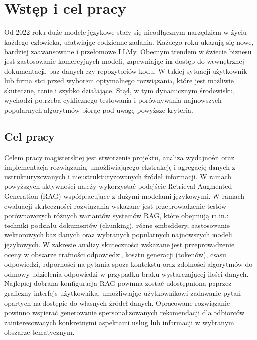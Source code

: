 \cleardoublepage

\chapter{Wstęp i cel pracy}
Od 2022 roku duże modele językowe stały się nieodłącznym narzędziem w życiu każdego człowieka, ułatwiając codzienne zadania. Każdego roku ukazują się nowe, bardziej zaawansowane i przełomowe LLMy. Obecnym trendem w świecie biznesu jest zastosowanie komercyjnych modeli, zapewniając im dostęp do wewnętrznej dokumentacji, baz danych czy repozytoriów kodu. W takiej sytuacji użytkownik lub firma stoi przed wyborem optymalnego rozwiązania, które jest możliwie skuteczne, tanie i szybko działające. Stąd, w tym dynamicznym środowisku, wychodzi potrzeba cyklicznego testowania i porównywania najnowszych popularnych algorytmów biorąc pod uwagę powyższe kryteria.


    \section{Cel pracy}
    Celem pracy magisterskiej jest stworzenie projektu, analiza wydajności oraz implementacja rozwiązania, umożliwiającego ekstrakcję i agregację danych z ustrukturyzowanych i nieustrukturyzowanych źródeł informacji. W ramach powyższych aktywności należy wykorzystać podejście Retrieval-Augmented Generation (RAG) współpracujące z dużymi modelami językowymi. W ramach ewaluacji skuteczności rozwiązania wskazane jest  przeprowadzenie testów porównawczych różnych wariantów systemów RAG, które obejmują m.in.: techniki podziału dokumentów (chunking), różne embeddery, zastosowanie wektorowych baz danych oraz wybranych popularnych najnowszych modeli językowych. W zakresie analizy skuteczności wskazane jest przeprowadzenie oceny w obszarze trafności odpowiedzi, kosztu generacji (tokenów), czasu odpowiedzi, odporności na pytania spoza kontekstu oraz zdolności algorytmów do odmowy udzielenia odpowiedzi w przypadku braku wystarczającej ilości danych. Najlepiej dobrana konfiguracja RAG powinna zostać udostępniona poprzez graficzny interfejs użytkownika, umożliwiając użytkownikowi zadawanie pytań opartych na dostępie do własnych źródeł danych. Opracowane rozwiązanie powinno wspierać generowanie spersonalizowanych rekomendacji dla odbiorców zainteresowanych konkretnymi aspektami usług lub informacji w wybranym obszarze tematycznym.